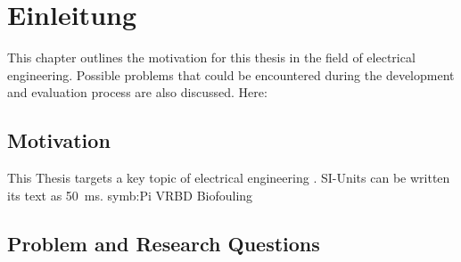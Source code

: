 \documentclass[class=scrbook, crop=false]{standalone}
\begin{document}
\chapter{Einleitung}
\label{ch::Einleitung}
    This chapter outlines the motivation for this thesis in the field of electrical engineering. Possible problems that could be encountered during the development and evaluation process are also discussed. Here: 

\section{Motivation}
\label{Section::Motivation}
    This Thesis targets a key topic of electrical engineering \cite{Piezoelectirc_Sensors_and_Actors}. SI-Units can be written its text as \SI{50}{\ms}. \gls{symb:Pi} \gls{VRBD} \gls{Biofouling}

\section{Problem and Research Questions}
\label{Section::Problem_and_Research_Questions}
    \Blindtext

\ifstandalone
    \printglossary
    \printbibliography[heading=bibintoc]
\fi
\end{document}
